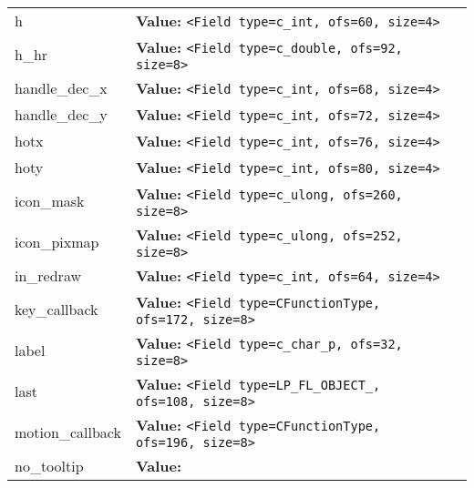 \begin{longtable}{|p{\varnamewidth}|p{\vardescrwidth}|l}
\cline{1-2}
\raggedright h\- & \raggedright \textbf{Value:} 
{\tt {\textless}Field type=c\_int, ofs=60, size=4{\textgreater}}&\\
\cline{1-2}
\raggedright h\-\_\-h\-r\- & \raggedright \textbf{Value:} 
{\tt {\textless}Field type=c\_double, ofs=92, size=8{\textgreater}}&\\
\cline{1-2}
\raggedright h\-a\-n\-d\-l\-e\-\_\-d\-e\-c\-\_\-x\- & \raggedright \textbf{Value:} 
{\tt {\textless}Field type=c\_int, ofs=68, size=4{\textgreater}}&\\
\cline{1-2}
\raggedright h\-a\-n\-d\-l\-e\-\_\-d\-e\-c\-\_\-y\- & \raggedright \textbf{Value:} 
{\tt {\textless}Field type=c\_int, ofs=72, size=4{\textgreater}}&\\
\cline{1-2}
\raggedright h\-o\-t\-x\- & \raggedright \textbf{Value:} 
{\tt {\textless}Field type=c\_int, ofs=76, size=4{\textgreater}}&\\
\cline{1-2}
\raggedright h\-o\-t\-y\- & \raggedright \textbf{Value:} 
{\tt {\textless}Field type=c\_int, ofs=80, size=4{\textgreater}}&\\
\cline{1-2}
\raggedright i\-c\-o\-n\-\_\-m\-a\-s\-k\- & \raggedright \textbf{Value:} 
{\tt {\textless}Field type=c\_ulong, ofs=260, size=8{\textgreater}}&\\
\cline{1-2}
\raggedright i\-c\-o\-n\-\_\-p\-i\-x\-m\-a\-p\- & \raggedright \textbf{Value:} 
{\tt {\textless}Field type=c\_ulong, ofs=252, size=8{\textgreater}}&\\
\cline{1-2}
\raggedright i\-n\-\_\-r\-e\-d\-r\-a\-w\- & \raggedright \textbf{Value:} 
{\tt {\textless}Field type=c\_int, ofs=64, size=4{\textgreater}}&\\
\cline{1-2}
\raggedright k\-e\-y\-\_\-c\-a\-l\-l\-b\-a\-c\-k\- & \raggedright \textbf{Value:} 
{\tt {\textless}Field type=CFunctionType, ofs=172, size=8{\textgreater}}&\\
\cline{1-2}
\raggedright l\-a\-b\-e\-l\- & \raggedright \textbf{Value:} 
{\tt {\textless}Field type=c\_char\_p, ofs=32, size=8{\textgreater}}&\\
\cline{1-2}
\raggedright l\-a\-s\-t\- & \raggedright \textbf{Value:} 
{\tt {\textless}Field type=LP\_FL\_OBJECT\_, ofs=108, size=8{\textgreater}}&\\
\cline{1-2}
\raggedright m\-o\-t\-i\-o\-n\-\_\-c\-a\-l\-l\-b\-a\-c\-k\- & \raggedright \textbf{Value:} 
{\tt {\textless}Field type=CFunctionType, ofs=196, size=8{\textgreater}}&\\
\cline{1-2}
\raggedright n\-o\-\_\-t\-o\-o\-l\-t\-i\-p\- & \raggedright \textbf{Value:} 

\end{longtable}
